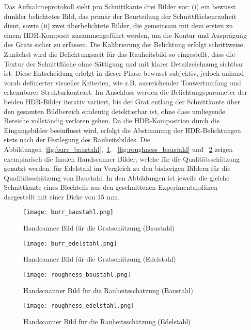 Das Aufnahmeprotokoll sieht pro Schnittkante drei Bilder vor: (i) ein bewusst dunkler belichtetes Bild, das primär der Beurteilung der Schnittflächenrauheit dient, sowie (ii) zwei überbelichtete Bilder, die gemeinsam mit dem ersten zu einem HDR-Komposit zusammengeführt werden, um die Kontur und Ausprägung des Grats sicher zu erfassen. Die Kalibrierung der Belichtung erfolgt schrittweise. Zunächst wird die Belichtungszeit für das Rauheitsbild so eingestellt, dass die Textur der Schnittfläche ohne Sättigung und mit klarer Detailzeichnung sichtbar ist. Diese Entscheidung erfolgt in dieser Phase bewusst subjektiv, jedoch anhand vorab definierter visueller Kriterien, wie z.B. ausreichender Tonwertumfang und erkennbarer Strukturkontrast. Im Anschluss werden die Belichtungsparameter der beiden HDR-Bilder iterativ variiert, bis der Grat entlang der Schnittkante über den gesamten Bildbereich eindeutig detektierbar ist, ohne dass umliegende Bereiche vollständig verloren gehen. Da die HDR-Komposition durch die Eingangsbilder beeinflusst wird, erfolgt die Abstimmung der HDR-Belichtungen stets nach der Festlegung des Rauheitsbildes. 
Die Abbildungen~\ref{fig:burr_baustahl},~\ref{fig:burr_edelstahl}, ~\ref{fig:roughness_baustahl} und ~\ref{fig:roughness_edelstahl} zeigen exemplarisch die finalen Handscanner Bilder, welche für die Qualitätsschätzung genutzt werden, für Edelstahl im Vergleich zu den bisherigen Bildern für die Qualitätsschätzung von Baustahl. In den Abbildungen ist jeweils die gleiche Schnittkante eines Blechteils aus den geschnittenen Experimentalplänen dargestellt mit einer Dicke von 15 mm.

\begin{figure}[htbp]
  \centering
  \begin{minipage}{0.48\linewidth}
    \centering
    \texttt{[image: burr\_baustahl.png]}
    \caption{Handcanner Bild für die Gratschätzung (Baustahl)}
    \label{fig:burr_baustahl}
  \end{minipage}\hfill
  \begin{minipage}{0.48\linewidth}
    \centering
    \texttt{[image: burr\_edelstahl.png]}
    \caption{Handcanner Bild für die Gratschätzung (Edelstahl)}
    \label{fig:burr_edelstahl}
  \end{minipage}
\end{figure}

\begin{figure}[htbp]
  \centering
  \begin{minipage}{0.48\linewidth}
    \centering
    \texttt{[image: roughness\_baustahl.png]}
    \caption{Handscnanner Bild für die Rauheitsschätzung (Baustahl)}
    \label{fig:roughness_baustahl}
  \end{minipage}\hfill
  \begin{minipage}{0.48\linewidth}
    \centering
    \texttt{[image: roughness\_edelstahl.png]}
    \caption{Handscanner Bild für die Rauheitsschätzung (Edelstahl)}
    \label{fig:roughness_edelstahl}
  \end{minipage}
\end{figure}

